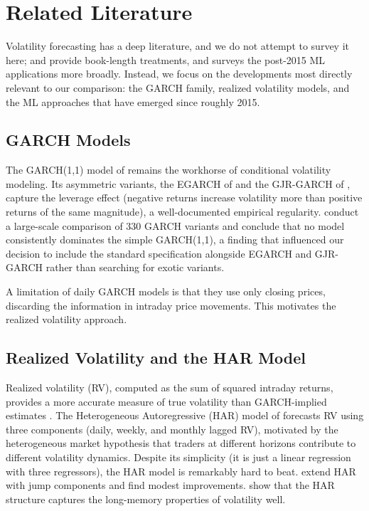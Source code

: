 \section{Related Literature}\label{sec:literature}

Volatility forecasting has a deep literature, and we do not attempt to survey it here; \citet{Poon2003} and \citet{Andersen2006} provide book-length treatments, and \citet{Khan2026} surveys the post-2015 ML applications more broadly. Instead, we focus on the developments most directly relevant to our comparison: the GARCH family, realized volatility models, and the ML approaches that have emerged since roughly 2015.

\subsection{GARCH Models}

The GARCH(1,1) model of \citet{Bollerslev1986} remains the workhorse of conditional volatility modeling. Its asymmetric variants, the EGARCH of \citet{Nelson1991} and the GJR-GARCH of \citet{Glosten1993}, capture the leverage effect (negative returns increase volatility more than positive returns of the same magnitude), a well-documented empirical regularity. \citet{Hansen2005} conduct a large-scale comparison of 330 GARCH variants and conclude that no model consistently dominates the simple GARCH(1,1), a finding that influenced our decision to include the standard specification alongside EGARCH and GJR-GARCH rather than searching for exotic variants.

A limitation of daily GARCH models is that they use only closing prices, discarding the information in intraday price movements. This motivates the realized volatility approach.

\subsection{Realized Volatility and the HAR Model}

Realized volatility (RV), computed as the sum of squared intraday returns, provides a more accurate measure of true volatility than GARCH-implied estimates \citep{Andersen2003}. The Heterogeneous Autoregressive (HAR) model of \citet{Corsi2009} forecasts RV using three components (daily, weekly, and monthly lagged RV), motivated by the heterogeneous market hypothesis that traders at different horizons contribute to different volatility dynamics. Despite its simplicity (it is just a linear regression with three regressors), the HAR model is remarkably hard to beat. \citet{Bollerslev2016} extend HAR with jump components and find modest improvements. \citet{Patton2015} show that the HAR structure captures the long-memory properties of volatility well.

